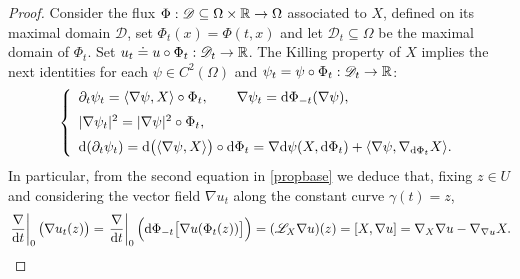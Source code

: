 \documentclass[10 pt,a4paper]{article}
\theoremstyle{definition}
\begin{document}
\begin{proof}
Consider the flux $\Phi : \mathscr{D} \subseteq \Omega \times \mathbb R \to \Omega$ associated to $X$, defined on its maximal domain $\mathscr{D}$, set  $\Phi_t(x)=\Phi(t,x)$ and let $\mathscr{D}_t \subseteq \Omega$ be the maximal domain of $\Phi_t$. Set $u_t \doteq u \circ \Phi_t : \mathscr{D}_t \to \mathbb R$. The Killing property of $X$ implies the next identities for each $\psi \in C^2(\Omega)$ and $\psi_t = \psi \circ \Phi_t : \mathscr{D}_t \to \mathbb R$:
	\begin{equation}\label{propbase}
		\left\{\begin{array}{l}
			\partial_t \psi_t = \langle \nabla \psi, X\rangle \circ \Phi_t, \qquad \nabla \psi_t = \di \Phi_{-t}(\nabla \psi), \\[0.2cm]
			|\nabla \psi_t|^2 = %
			|\nabla \psi|^2 \circ \Phi_t, \\[0.2cm]
			\di (\partial_t \psi_t) = \di\big(\langle \nabla \psi, X\rangle \big) \circ \di \Phi_t = \nabla \di  \psi(X, \di \Phi_t) + \langle \nabla \psi, \nabla_{\di \Phi_t} X \rangle.
		\end{array}\right.
	\end{equation}
	In particular, from the second equation in \eqref{propbase} we deduce that, fixing $z \in U$ and considering the vector field $\nabla u_t$ along the constant curve $\gamma(t)=z$, 
	\begin{equation}\label{derit}
		\left.\frac{\nabla}{\mathrm{d} t}\right|_{0}\big(\nabla u_t(z)\big) = \left.\frac{\nabla}{\mathrm{d} t}\right|_0 \Big(\mathrm{d} \Phi_{-t}\big[\nabla u(\Phi_t(z))\big]\Big) = (\mathscr{L}_X \nabla u)(z) = [X, \nabla u] = \nabla_X \nabla u - \nabla_{\nabla u}X.
	\end{equation}
	

\end{proof}
\end{document}
